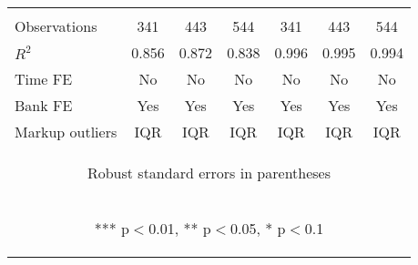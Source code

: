 \documentclass[]{article}
\begin{document}
\begin{center}
\begin{tabular}{lcccccc}
\vspace{4pt} & \begin{footnotesize}\end{footnotesize} & \begin{footnotesize}\end{footnotesize} & \begin{footnotesize}\end{footnotesize} & \begin{footnotesize}\end{footnotesize} & \begin{footnotesize}\end{footnotesize} & \begin{footnotesize}\end{footnotesize} \\
Observations & 341 & 443 & 544 & 341 & 443 & 544 \\
$R^2$ & 0.856 & 0.872 & 0.838 & 0.996 & 0.995 & 0.994 \\
Time FE & No & No & No & No & No & No \\
Bank FE & Yes & Yes & Yes & Yes & Yes & Yes \\
 Markup outliers & IQR & IQR & IQR & IQR & IQR & IQR \\ \hline
\multicolumn{7}{c}{\begin{footnotesize} Robust standard errors in parentheses\end{footnotesize}} \\
\multicolumn{7}{c}{\begin{footnotesize} *** p$<$0.01, ** p$<$0.05, * p$<$0.1\end{footnotesize}} \\
\end{tabular}
\end{center}
\end{document}

